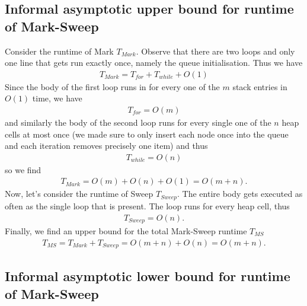\documentclass{article}
\begin{document}
\subsection{Informal asymptotic upper bound for runtime of Mark-Sweep}

Consider the runtime of Mark $T_{Mark}$. Observe that there are two loops
and only one line that gets run exactly once, namely the queue initialisation.
Thus we have
\begin{align*}
	T_{Mark} = T_{for} + T_{while} + O(1)
\end{align*}
Since the body of the first loop runs in for every one of the $m$ stack entries
in $O(1)$ time, we have
\begin{align*}
	T_{for} = O(m)
\end{align*}
and similarly the body of the second loop runs for every single one of
the $n$ heap cells at most once
(we made sure to only insert each node once into the queue and each iteration
removes precisely one item) and thus
\begin{align*}
	T_{while} = O(n)
\end{align*}
so we find
\begin{align*}
	T_{Mark} = O(m) + O(n) + O(1) = O(m + n).
\end{align*}
Now, let's consider the runtime of Sweep $T_{Sweep}$. The entire body gets
executed as often as the single loop that is present. The loop runs for every
heap cell, thus
\begin{align*}
	T_{Sweep} = O(n).
\end{align*}
Finally, we find an upper bound for the total Mark-Sweep runtime $T_{MS}$
\begin{align}
	\label{infhims}
	T_{MS} = T_{Mark} + T_{Sweep} = O(m+n) + O(n) = O(m + n).
\end{align}

\subsection{Informal asymptotic lower bound for runtime of Mark-Sweep}
\end{document}

